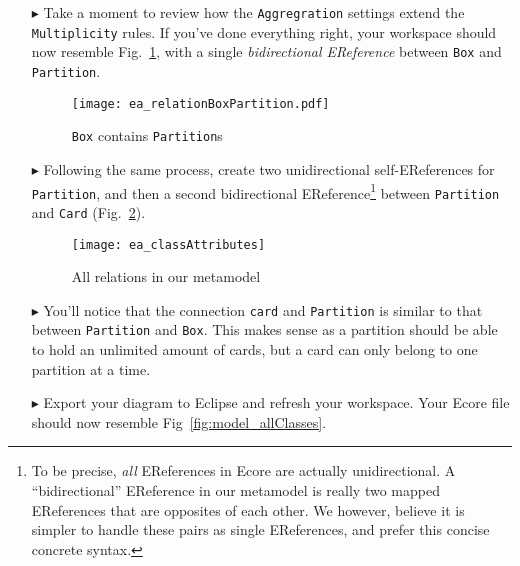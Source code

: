 \begin{itemize}
\item[$\blacktriangleright$] Take a moment to review how the \texttt{Aggregration} settings extend the \texttt{Multiplicity} rules. If you've done everything
right, your workspace should now resemble Fig.~\ref{fig:ereference_completed}, with a single \emph{bidirectional EReference} between \texttt{Box} and
\texttt{Partition}.

\vspace{1cm}

\begin{figure}[htbp]
	\centering
  \texttt{[image: ea\_relationBoxPartition.pdf]}
	\caption{\texttt{Box} contains \texttt{Partition}s}
	\label{fig:ereference_completed}
\end{figure}
\FloatBarrier

\item[$\blacktriangleright$] Following the same process, create two unidirectional self-EReferences for \texttt{Partition}, and then a second bidirectional
EReference\footnote{To be precise, \emph{all} EReferences in Ecore are actually unidirectional. A ``bidirectional'' EReference in our metamodel is really two
mapped EReferences that are opposites of each other. We however, believe it is simpler to handle these pairs as single EReferences, and prefer this
concise concrete syntax.} between \texttt{Partition} and \texttt{Card} (Fig.~\ref{fig:ereferences_all}). 

\vspace{1cm}

\begin{figure}[htbp]
	\centering
  \texttt{[image: ea\_classAttributes]}
	\caption{All relations in our metamodel}
	\label{fig:ereferences_all}
\end{figure}
\FloatBarrier

\vspace{1cm}

\item[$\blacktriangleright$] You'll notice that the connection \texttt{card} and \texttt{Partition} is similar to that between \texttt{Partition} and
\texttt{Box}. This makes sense as a partition should be able to hold an unlimited amount of cards, but a card can only belong to one partition at a time.

\vspace{1cm}

\item[$\blacktriangleright$] Export your diagram to Eclipse and refresh your workspace. Your Ecore file should now resemble Fig~\ref{fig:model_allClasses}.


\end{itemize}
